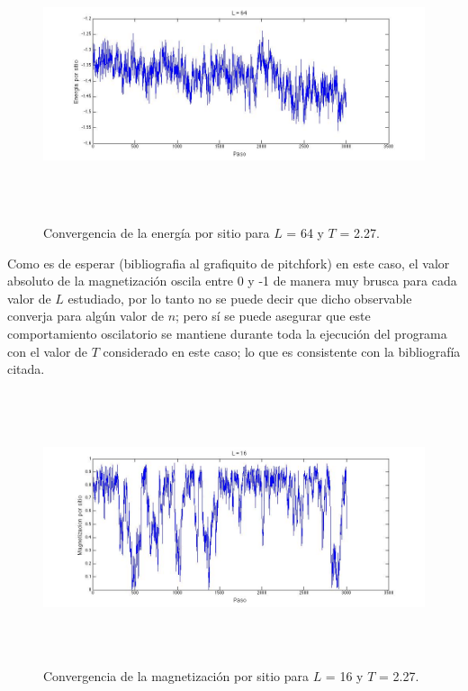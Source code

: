 \documentclass[a4paper,12pt]{article}
\begin{document}
\begin{figure}[H]
\begin{center}
\includegraphics[height=8cm]{../graficos/En_L64_T227.jpg}
\caption[width=5cm]{Convergencia de la energ\'ia por sitio para $L$ = 64 y $T$ = 2.27.}
\end{center}
\end{figure}


Como es de esperar (bibliografia al grafiquito de pitchfork) en este caso, el valor absoluto de la magnetizaci\'on oscila entre 0 y -1 de manera muy brusca para cada valor de $L$ estudiado, por lo tanto no se puede decir que dicho observable converja para alg\'un valor de $n$; pero s\'i se puede asegurar que este comportamiento oscilatorio se mantiene durante toda la ejecuci\'on del programa con el valor de $T$ considerado en este caso; lo que es consistente con la bibliograf\'ia citada.

\begin{figure}[H]
\begin{center}
\includegraphics[height=8cm]{../graficos/Mag_L16_T227.jpg}
\caption[width=5cm]{Convergencia de la magnetizaci\'on por sitio para $L$ = 16 y $T$ = 2.27.}
\end{center}
\end{figure}
\end{document}
